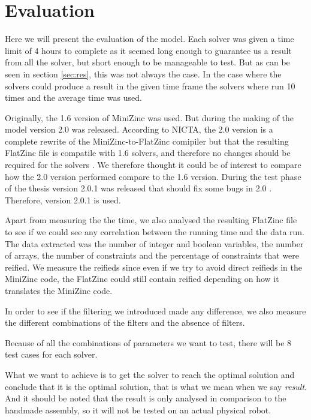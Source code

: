\chapter{Evaluation}\label{cha:eval}
Here we will present the evaluation of the model. Each solver was given a time limit of 4 hours to complete as it seemed long enough to guarantee us a result from all the solver, but short enough to be manageable to test. But as can be seen in section \ref{sec:res}, this was not always the case. In the case where the solvers could produce a result in the given time frame the solvers where run 10 times and the average time was used.

Originally, the 1.6 version of MiniZinc was used. But during the making of the model version 2.0 was released. According to NICTA, the 2.0 version is a complete rewrite of the MiniZinc-to-FlatZinc comipiler but that the resulting FlatZinc file is compatile with 1.6 solvers, and therefore no changes should be required for the solvers \cite{mz2}. We therefore thought it could be of interest to compare how the 2.0 version performed compare to the 1.6 version. During the test phase of the thesis version 2.0.1 was released that should fix some bugs in 2.0 \cite{mz2_changelog}. Therefore, version 2.0.1 is used.

Apart from measuring the the time, we also analysed the resulting FlatZinc file to see if we could see any correlation between the running time and the data run. The data extracted was the number of integer and boolean variables, the number of arrays, the number of constraints and the percentage of constraints that were reified. We measure the reifieds since even if we try to avoid direct reifieds in the MiniZinc code, the FlatZinc could still contain reified depending on how it translates the MiniZinc code.

In order to see if the filtering we introduced made any difference, we also measure the different combinations of the filters and the absence of filters.

Because of all the combinations of parameters we want to test, there will be 8 test cases for each solver.

What we want to achieve is to get the solver to reach the optimal solution and conclude that it is the optimal solution, that is what we mean when we say \emph{result}. And it should be noted that the result is only analysed in comparison to the handmade assembly, so it will not be tested on an actual physical robot.

